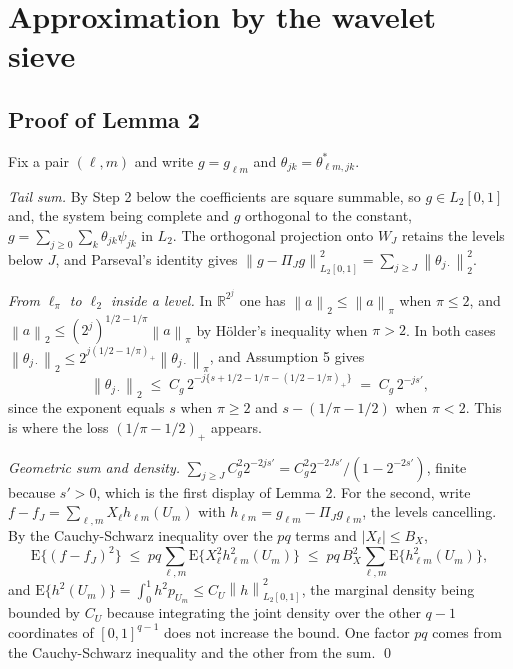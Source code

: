 \documentclass[10pt]{book}
\theoremstyle{definition}
\newcommand{\R}{\mathbb{R}}
\newcommand{\E}{\mathrm{E}}
\newcommand{\norm}[1]{\left\lVert #1 \right\rVert}
\newcommand{\cv}{\ell}
\newcommand{\md}{m}
\newcommand{\lev}{j}
\newcommand{\tsl}{k}
\newcommand{\gcomp}[2]{g_{#1#2}}
\newcommand{\wav}[2]{\psi_{#1#2}}
\newcommand{\WJ}{W_{J}}
\newcommand{\PiJ}{\Pi_{J}}
\newcommand{\coefs}[4]{\theta^{*}_{#1#2,#3#4}}
\newcommand{\seff}{s'}
\begin{document}
\section{Approximation by the wavelet sieve}
\setcounter{equation}{0}

\subsection*{Proof of Lemma 2}

Fix a pair $(\cv,\md)$ and write $g = \gcomp{\cv}{\md}$ and
$\theta_{\lev\tsl} = \coefs{\cv}{\md}{\lev}{\tsl}$.

\emph{Tail sum.} By Step 2 below the coefficients are square summable, so
$g \in L_2[0,1]$ and, the system being complete and $g$ orthogonal to the
constant, $g = \sum_{\lev\ge0}\sum_{\tsl}\theta_{\lev\tsl}\wav{\lev}{\tsl}$ in
$L_2$. The orthogonal projection onto $\WJ$ retains the levels below $J$, and
Parseval's identity gives
$\norm{g-\PiJ g}^2_{L_2[0,1]} = \sum_{\lev\ge J}
\norm{\theta_{\lev\cdot}}_2^2$.

\emph{From $\ell_\pi$ to $\ell_2$ inside a level.} In $\R^{2^{\lev}}$ one has
$\norm{a}_2 \le \norm{a}_{\pi}$ when $\pi \le 2$, and
$\norm{a}_2 \le (2^{\lev})^{1/2-1/\pi}\norm{a}_{\pi}$ by Hölder's inequality
when $\pi > 2$. In both cases $\norm{\theta_{\lev\cdot}}_2 \le
2^{\lev(1/2-1/\pi)_{+}}\norm{\theta_{\lev\cdot}}_{\pi}$, and
Assumption 5 gives
\[
  \norm{\theta_{\lev\cdot}}_2 \;\le\;
  C_g\,2^{-\lev\{s+1/2-1/\pi-(1/2-1/\pi)_{+}\}}
  \;=\; C_g\,2^{-\lev\seff},
\]
since the exponent equals $s$ when $\pi \ge 2$ and $s-(1/\pi-1/2)$ when
$\pi < 2$. This is where the loss $(1/\pi-1/2)_{+}$ appears.

\emph{Geometric sum and density.}
$\sum_{\lev\ge J}C_g^2 2^{-2\lev\seff} = C_g^2 2^{-2J\seff}/(1-2^{-2\seff})$,
finite because $\seff > 0$, which is the first display of Lemma 2. For the
second, write $f-f_J = \sum_{\cv,\md}X_{\cv}h_{\cv\md}(U_{\md})$ with
$h_{\cv\md} = \gcomp{\cv}{\md}-\PiJ\gcomp{\cv}{\md}$, the levels cancelling.
By the Cauchy-Schwarz inequality over the $pq$ terms and
$|X_{\cv}| \le B_X$,
\[
  \E\{(f-f_J)^2\} \;\le\; pq\sum_{\cv,\md}
  \E\{X_{\cv}^2h_{\cv\md}^2(U_{\md})\}
  \;\le\; pq\,B_X^2\sum_{\cv,\md}\E\{h_{\cv\md}^2(U_{\md})\},
\]
and $\E\{h^2(U_{\md})\} = \int_0^1 h^2 p_{U_{\md}} \le C_U\norm{h}^2_{L_2[0,1]}$,
the marginal density being bounded by $C_U$ because integrating the joint
density over the other $q-1$ coordinates of $[0,1]^{q-1}$ does not increase
the bound. One factor $pq$ comes from the Cauchy-Schwarz inequality and the
other from the sum. \qed
\end{document}
